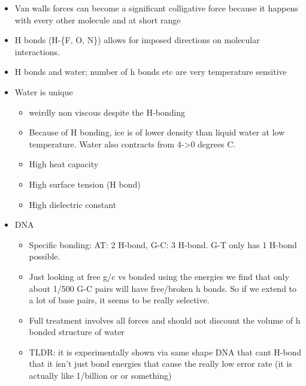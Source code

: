 \documentclass[10pt]{article}
\begin{document}
\begin{itemize}
\item Van walls forces can become a significant colligative force because it happens with every other molecule and at short range
\item H bonds (H-\{F, O, N\}) allows for imposed directions on molecular interactions.
\item H bonds and water; number of h bonds etc are very temperature sensitive
\item Water is unique
	\begin{itemize}
		\item weirdly non viscous despite the H-bonding
		\item Because of H bonding, ice is of lower density than liquid water at low temperature. Water also contracts from 4->0 degrees C.
		\item High heat capacity
		\item High surface tension (H bond)
		\item High dielectric constant
	\end{itemize}

\item DNA

	\begin{itemize}
		\item Specific bonding: AT: 2 H-bond, G-C: 3 H-bond. G-T only has 1 H-bond possible. 
		\item Just looking at free g/c vs bonded using the energies we find that only about 1/500 G-C pairs will have free/broken h bonds. So if we extend to a lot of base pairs, it seems to be really selective.
		\item Full treatment involves all forces and should not discount the volume of h bonded structure of water
		\item TLDR: it is experimentally shown via same shape DNA that cant H-bond that it isn't just bond energies that cause the really low error rate (it is actually like 1/billion or or something)

	\end{itemize}


\end{itemize}
\end{document}
